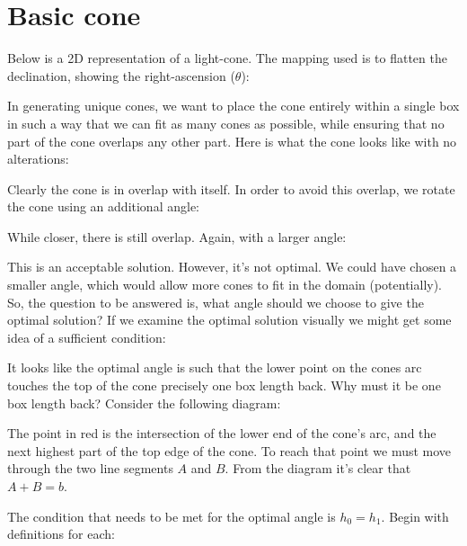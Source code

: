 \documentclass[12pt]{article}
\begin{document}
\section{Basic cone}

Below is a 2D representation of a light-cone. The mapping used is
to flatten the declination, showing the right-ascension ($\theta$):

\resizebox{\textwidth}{!}{}

In generating unique cones, we want to place the cone entirely within
a single box in such a way that we can fit as many cones as possible,
while ensuring that no part of the cone overlaps any other part. Here is
what the cone looks like with no alterations:

\resizebox{\textwidth}{!}{}

Clearly the cone is in overlap with itself. In order to avoid this
overlap, we rotate the cone using an additional angle:

\resizebox{\textwidth}{!}{}

While closer, there is still overlap. Again, with a larger angle:

\resizebox{\textwidth}{!}{}

This is an acceptable solution. However, it's not optimal. We could have
chosen a smaller angle, which would allow more cones to fit in the domain
(potentially). So, the question to be answered is, what angle should we
choose to give the optimal solution? If we examine the optimal solution
visually we might get some idea of a sufficient condition:

\resizebox{\textwidth}{!}{}

It looks like the optimal angle is such that the lower point on the
cones arc touches the top of the cone precisely one box length back. Why
must it be one box length back? Consider the following diagram:

\resizebox{\textwidth}{!}{}

The point in red is the intersection of the lower end of the cone's arc,
and the next highest part of the top edge of the cone. To reach that point
we must move through the two line segments $A$ and $B$. From the diagram it's clear
that $A + B = b$.

\resizebox{\textwidth}{!}{}

The condition that needs to be met for the optimal angle is $h_0 = h_1$.
Begin with definitions for each:
\end{document}
